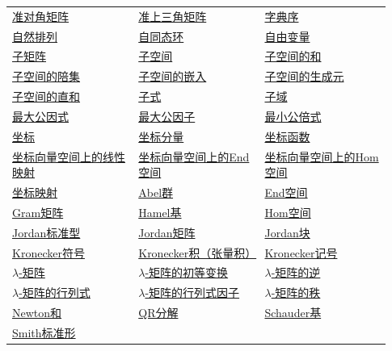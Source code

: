 \begin{longtable}{@{}>{\raggedright\arraybackslash}p{0.31\linewidth}>{\raggedright\arraybackslash}p{0.31\linewidth}>{\raggedright\arraybackslash}p{0.31\linewidth}@{}}
\hyperref[p1:concept:c3-l1322]{准对角矩阵} & \hyperref[p1:concept:c3-l1322]{准上三角矩阵} & \hyperref[p1:concept:c1-l1324]{字典序}\\
\hyperref[p1:concept:c3-l1812]{自然排列} & \hyperref[p1:concept:c3-l359]{自同态环} & \hyperref[p1:concept:c2-l129]{自由变量}\\
\hyperref[p1:concept:c3-l2544]{子矩阵} & \hyperref[p1:concept:c4-l585]{子空间} & \hyperref[p1:concept:c4-l881]{子空间的和}\\
\hyperref[p1:concept:c4-l276]{子空间的陪集} & \hyperref[p1:concept:c4-l1323]{子空间的嵌入} & \hyperref[p1:concept:c4-l722]{子空间的生成元}\\
\hyperref[p1:concept:c4-l1080]{子空间的直和} & \hyperref[p1:concept:c3-l2632]{子式} & \hyperref[p1:concept:c1-l526]{子域}\\
\hyperref[p1:concept:c1-l644]{最大公因式} & \hyperref[p1:concept:c1-l101]{最大公因子} & \hyperref[p1:concept:c1-l2164]{最小公倍式}\\
\hyperref[p1:concept:c4-l502]{坐标} & \hyperref[p1:concept:c4-l502]{坐标分量} & \hyperref[p1:concept:c7-l108]{坐标函数}\\
\hyperref[p1:concept:c3-l7]{坐标向量空间上的线性映射} & \hyperref[p1:concept:c3-l7]{坐标向量空间上的End空间} & \hyperref[p1:concept:c3-l7]{坐标向量空间上的Hom空间}\\
\hyperref[p1:concept:c4-l502]{坐标映射} & \hyperref[p1:concept:c1-l7]{Abel群} & \hyperref[p1:concept:c4-l1349]{End空间}\\
\hyperref[p1:concept:c6-l624]{Gram矩阵} & \hyperref[p1:concept:c4-l3090]{Hamel基} & \hyperref[p1:concept:c4-l1349]{Hom空间}\\
\hyperref[p1:concept:c5-l2950]{Jordan标准型} & \hyperref[p1:concept:c5-l2911]{Jordan矩阵} & \hyperref[p1:concept:c5-l2911]{Jordan块}\\
\hyperref[p1:concept:c6-l399]{Kronecker符号} & \hyperref[p1:concept:c3-l2915]{Kronecker积（张量积）} & \hyperref[p1:concept:c3-l652]{Kronecker记号}\\
\hyperref[p1:concept:c5-l1709]{$\lambda$-矩阵} & \hyperref[p1:concept:c5-l2058]{$\lambda$-矩阵的初等变换} & \hyperref[p1:concept:c5-l1937]{$\lambda$-矩阵的逆}\\
\hyperref[p1:concept:c5-l1819]{$\lambda$-矩阵的行列式} & \hyperref[p1:concept:c5-l2205]{$\lambda$-矩阵的行列式因子} & \hyperref[p1:concept:c5-l1905]{$\lambda$-矩阵的秩}\\
\hyperref[p1:concept:c1-l1385]{Newton和} & \hyperref[p1:concept:c6-l2744]{QR分解} & \hyperref[p1:concept:c4-l3113]{Schauder基}\\
\hyperref[p1:concept:c5-l2095]{Smith标准形} &  & \\
\end{longtable}
\endgroup
